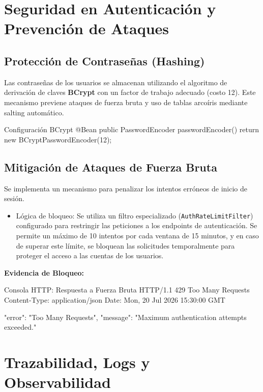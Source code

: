\documentclass[11pt,oneside]{article}
\begin{document}
\newpage

\section{Seguridad en Autenticación y Prevención de Ataques}

\subsection{Protección de Contraseñas (Hashing)}
Las contraseñas de los usuarios se almacenan utilizando el algoritmo de derivación de claves \textbf{BCrypt} con un factor de trabajo adecuado (costo 12). Este mecanismo previene ataques de fuerza bruta y uso de tablas arcoíris mediante salting automático.

\begin{codewindow}[language=Java]{Configuración BCrypt}
@Bean
public PasswordEncoder passwordEncoder() {
    return new BCryptPasswordEncoder(12);
}
\end{codewindow}

\subsection{Mitigación de Ataques de Fuerza Bruta}
Se implementa un mecanismo para penalizar los intentos erróneos de inicio de sesión.
\begin{itemize}
    \item Lógica de bloqueo: Se utiliza un filtro especializado (\texttt{AuthRateLimitFilter}) configurado para restringir las peticiones a los endpoints de autenticación. Se permite un máximo de 10 intentos por cada ventana de 15 minutos, y en caso de superar este límite, se bloquean las solicitudes temporalmente para proteger el acceso a las cuentas de los usuarios.
\end{itemize}

\textbf{Evidencia de Bloqueo:}
\begin{codewindow}[language=Text]{Consola HTTP: Respuesta a Fuerza Bruta}
HTTP/1.1 429 Too Many Requests
Content-Type: application/json
Date: Mon, 20 Jul 2026 15:30:00 GMT

{
  "error": "Too Many Requests",
  "message": "Maximum authentication attempts exceeded."
}
\end{codewindow}

\section{Trazabilidad, Logs y Observabilidad}
\end{document}
